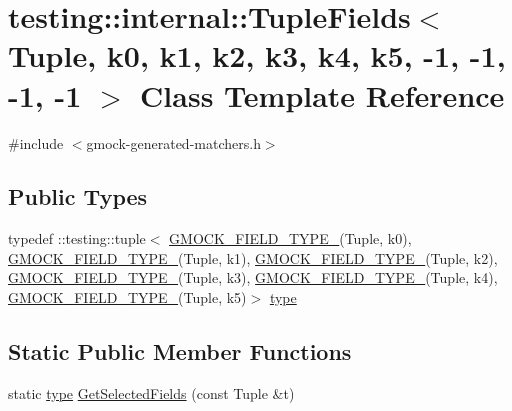 \hypertarget{classtesting_1_1internal_1_1_tuple_fields_3_01_tuple_00_01k0_00_01k1_00_01k2_00_01k3_00_01k4_00_fc3c297a037e5312ea5ea32562e3997e}{}\section{testing\+:\+:internal\+:\+:Tuple\+Fields$<$ Tuple, k0, k1, k2, k3, k4, k5, -\/1, -\/1, -\/1, -\/1 $>$ Class Template Reference}
\label{classtesting_1_1internal_1_1_tuple_fields_3_01_tuple_00_01k0_00_01k1_00_01k2_00_01k3_00_01k4_00_fc3c297a037e5312ea5ea32562e3997e}


{\ttfamily \#include $<$gmock-\/generated-\/matchers.\+h$>$}

\subsection*{Public Types}
\begin{DoxyCompactItemize}
\item 
typedef \+::testing\+::tuple$<$ \hyperlink{gmock-generated-matchers_8h_acf3e27de83a73f0d873da1cd471e505b}{G\+M\+O\+C\+K\+\_\+\+F\+I\+E\+L\+D\+\_\+\+T\+Y\+P\+E\+\_\+}(Tuple, k0), \hyperlink{gmock-generated-matchers_8h_acf3e27de83a73f0d873da1cd471e505b}{G\+M\+O\+C\+K\+\_\+\+F\+I\+E\+L\+D\+\_\+\+T\+Y\+P\+E\+\_\+}(Tuple, k1), \hyperlink{gmock-generated-matchers_8h_acf3e27de83a73f0d873da1cd471e505b}{G\+M\+O\+C\+K\+\_\+\+F\+I\+E\+L\+D\+\_\+\+T\+Y\+P\+E\+\_\+}(Tuple, k2), \hyperlink{gmock-generated-matchers_8h_acf3e27de83a73f0d873da1cd471e505b}{G\+M\+O\+C\+K\+\_\+\+F\+I\+E\+L\+D\+\_\+\+T\+Y\+P\+E\+\_\+}(Tuple, k3), \hyperlink{gmock-generated-matchers_8h_acf3e27de83a73f0d873da1cd471e505b}{G\+M\+O\+C\+K\+\_\+\+F\+I\+E\+L\+D\+\_\+\+T\+Y\+P\+E\+\_\+}(Tuple, k4), \hyperlink{gmock-generated-matchers_8h_acf3e27de83a73f0d873da1cd471e505b}{G\+M\+O\+C\+K\+\_\+\+F\+I\+E\+L\+D\+\_\+\+T\+Y\+P\+E\+\_\+}(Tuple, k5)$>$ \hyperlink{classtesting_1_1internal_1_1_tuple_fields_3_01_tuple_00_01k0_00_01k1_00_01k2_00_01k3_00_01k4_00_fc3c297a037e5312ea5ea32562e3997e_a4e9aef3e026c3b30cfc21b6776616926}{type}
\end{DoxyCompactItemize}
\subsection*{Static Public Member Functions}
\begin{DoxyCompactItemize}
\item 
static \hyperlink{classtesting_1_1internal_1_1_tuple_fields_3_01_tuple_00_01k0_00_01k1_00_01k2_00_01k3_00_01k4_00_fc3c297a037e5312ea5ea32562e3997e_a4e9aef3e026c3b30cfc21b6776616926}{type} \hyperlink{classtesting_1_1internal_1_1_tuple_fields_3_01_tuple_00_01k0_00_01k1_00_01k2_00_01k3_00_01k4_00_fc3c297a037e5312ea5ea32562e3997e_a15b4c351182e3b52ec7ce67cb6beb0f8}{Get\+Selected\+Fields} (const Tuple \&t)
\end{DoxyCompactItemize}


